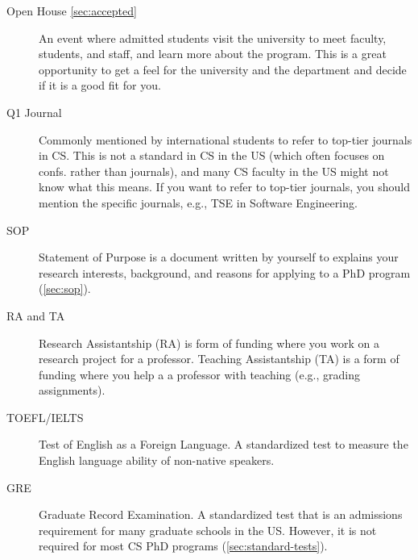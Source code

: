 \documentclass[oneside,11pt,dvipsnames]{book}
\begin{document}
\begin{description}
  \item[Open House \autoref{sec:accepted}] An event where admitted students visit the university to meet faculty, students, and staff, and learn more about the program. This is a great opportunity to get a feel for the university and the department and decide if it is a good fit for you.
  
  \item[Q1 Journal] Commonly mentioned by international students to refer to top-tier journals in CS.  This is not a standard in CS in the US (which often focuses on confs. rather than journals), and many CS faculty in the US might not know what this means.  If you want to refer to top-tier journals, you should mention the specific journals, e.g., TSE in Software Engineering.
  
  \item[SOP] Statement of Purpose is a document written by yourself to explains your research interests, background, and reasons for applying to a PhD program (\autoref{sec:sop}).

  \item[RA and TA] Research Assistantship (RA) is form of funding where you work on a research project for a professor. Teaching Assistantship (TA) is a form of funding where you help a a professor with teaching (e.g., grading assignments).

  \item[TOEFL/IELTS] Test of English as a Foreign Language. A standardized test to measure the English language ability of non-native speakers.
  \item[GRE] Graduate Record Examination. A standardized test that is an admissions requirement for many graduate schools in the US. However, it is not required for most CS PhD programs (\autoref{sec:standard-tests}).


\end{description}
\end{document}
